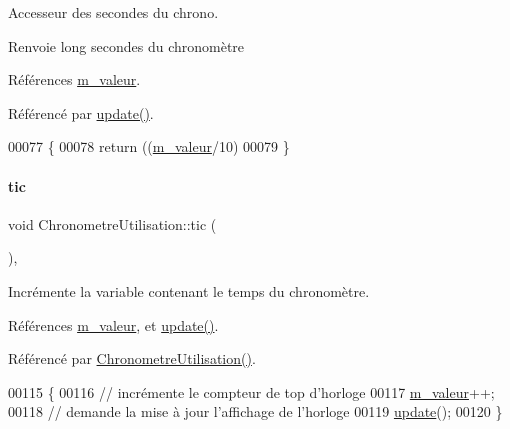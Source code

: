 Accesseur des secondes du chrono.

\begin{DoxyReturn}{Renvoie}
long secondes du chronomètre 
\end{DoxyReturn}


Références \hyperlink{class_chronometre_utilisation_a7ef8b30ae4b6db56b9be832c847186ea}{m\+\_\+valeur}.



Référencé par \hyperlink{class_chronometre_utilisation_add760c3052342baec482fe0752a89b86}{update()}.


\begin{DoxyCode}
00077 \{
00078      \textcolor{keywordflow}{return} ((\hyperlink{class_chronometre_utilisation_a7ef8b30ae4b6db56b9be832c847186ea}{m\_valeur}/10)%
00079 \}
\end{DoxyCode}
\mbox{\label{class_chronometre_utilisation_ab8dc7eb855ec9e24daefa4e185051d2e}} 
\paragraph{\texorpdfstring{tic}{tic}}
{\footnotesize\ttfamily void Chronometre\+Utilisation\+::tic (\begin{DoxyParamCaption}{ }\end{DoxyParamCaption})\hspace{0.3cm}{\ttfamily [private]}, {\ttfamily [slot]}}

Incrémente la variable contenant le temps du chronomètre. 

Références \hyperlink{class_chronometre_utilisation_a7ef8b30ae4b6db56b9be832c847186ea}{m\+\_\+valeur}, et \hyperlink{class_chronometre_utilisation_add760c3052342baec482fe0752a89b86}{update()}.



Référencé par \hyperlink{class_chronometre_utilisation_a499bd70e5056ddb71df022848d1e345e}{Chronometre\+Utilisation()}.


\begin{DoxyCode}
00115 \{
00116     \textcolor{comment}{// incrémente le compteur de top d'horloge}
00117     \hyperlink{class_chronometre_utilisation_a7ef8b30ae4b6db56b9be832c847186ea}{m\_valeur}++;
00118     \textcolor{comment}{// demande la mise à jour l'affichage de l'horloge}
00119     \hyperlink{class_chronometre_utilisation_add760c3052342baec482fe0752a89b86}{update}();
00120 \}
\end{DoxyCode}
\mbox{\label{class_chronometre_utilisation_add760c3052342baec482fe0752a89b86}} 
